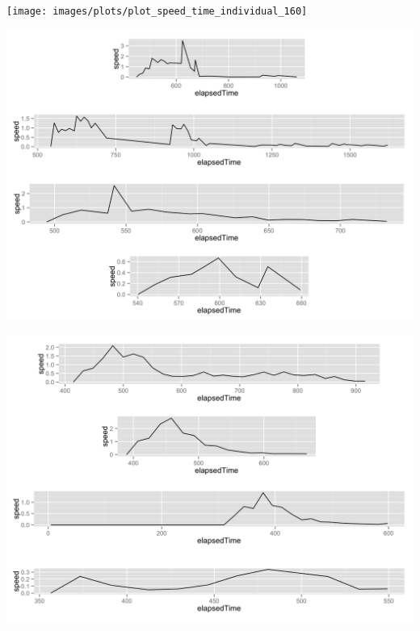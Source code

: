 \begin{appendices}
\begin{minipage}{\textwidth}
\begin{minipage}{0.5\linewidth}
	\end{minipage}
	\begin{minipage}{0.5\linewidth}
		\texttt{[image: images/plots/plot\_speed\_time\_individual\_160]}
	\end{minipage}
	\label{fig:kvaliativ_persons_3}
\end{minipage}

\begin{minipage}{\textwidth}
	\begin{minipage}{0.5\linewidth}
		\includegraphics[width=\linewidth]{images/plots/plot_speed_time_individual_166}
	\end{minipage}
		\begin{minipage}{0.5\linewidth}
		\includegraphics[width=\linewidth]{images/plots/plot_speed_time_individual_225}

\end{minipage}
\end{minipage}
\end{appendices}
